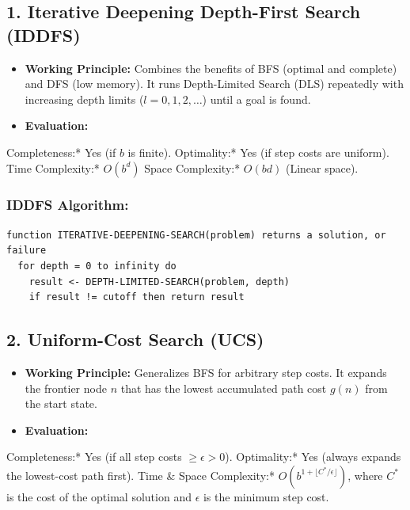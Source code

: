 \subsection{1. Iterative Deepening Depth-First Search (IDDFS)}

\begin{itemize}
  \item   \textbf{Working Principle:} Combines the benefits of BFS (optimal and complete) and DFS (low memory). It runs Depth-Limited Search (DLS) repeatedly with increasing depth limits ($l = 0, 1, 2, \dots$) until a goal is found.
  \item   \textbf{Evaluation:}
\end{itemize}
    \textit{   }Completeness:* Yes (if $b$ is finite).
    \textit{   }Optimality:* Yes (if step costs are uniform).
    \textit{   }Time Complexity:* $O(b^d)$
    \textit{   }Space Complexity:* $O(bd)$ (Linear space).

\subsubsection{IDDFS Algorithm:}
\begin{lstlisting}
function ITERATIVE-DEEPENING-SEARCH(problem) returns a solution, or failure
  for depth = 0 to infinity do
    result <- DEPTH-LIMITED-SEARCH(problem, depth)
    if result != cutoff then return result
\end{lstlisting}


\subsection{2. Uniform-Cost Search (UCS)}

\begin{itemize}
  \item   \textbf{Working Principle:} Generalizes BFS for arbitrary step costs. It expands the frontier node $n$ that has the lowest accumulated path cost $g(n)$ from the start state.
  \item   \textbf{Evaluation:}
\end{itemize}
    \textit{   }Completeness:* Yes (if all step costs $\ge \epsilon > 0$).
    \textit{   }Optimality:* Yes (always expands the lowest-cost path first).
    \textit{   }Time \& Space Complexity:* $O(b^{1 + \lfloor C^*/\epsilon \rfloor})$, where $C^*$ is the cost of the optimal solution and $\epsilon$ is the minimum step cost.


